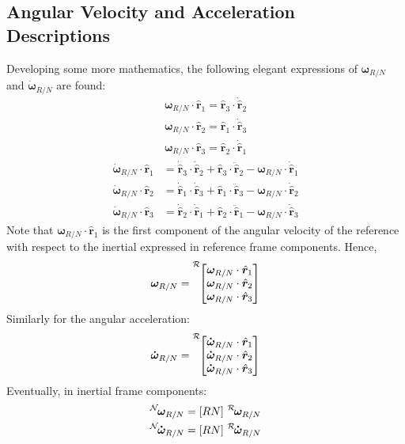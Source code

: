 \subsection{Angular Velocity and Acceleration Descriptions}
Developing some more mathematics, the following elegant expressions of $\bm\omega_{R/N}$ and $\dot{\bm\omega}_{R/N}$ are found:
\begin{subequations}
	\begin{align}
		\bm\omega_{R/N} \cdot \hat{\bm r}_{1}  = \hat{\bm r}_{3} \cdot \dot{\hat{\bm r}}_{2}  \\
		\bm\omega_{R/N} \cdot \hat{\bm r}_{2} = \hat{\bm r}_{1} \cdot \dot{\hat{\bm r}}_{3}\\
		\bm\omega_{R/N} \cdot \hat{\bm r}_{3} = \hat{\bm r}_{2} \cdot \dot{\hat{\bm r}}_{1}
	\end{align}
\end{subequations}
\begin{subequations}
	\begin{align}
		\dot{\bm\omega}_{R/N} \cdot \hat{\bm r}_{1} &=  
		\dot{\hat{\bm r}}_{3} \cdot \dot{\hat{\bm r}}_{2} + \hat{\bm r}_{3} \cdot \ddot{\hat{\bm r}}_{2} -  \bm\omega_{R/N} \cdot \dot{\hat{\bm r}}_{1}
		\\
		\dot{\bm\omega}_{R/N} \cdot \hat{\bm r}_{2} &= 
		 \dot{\hat{\bm r}}_{1} \cdot \dot{\hat{\bm r}}_{3} + \hat{\bm r}_{1} \cdot \ddot{\hat{\bm r}}_{3} -  \bm\omega_{R/N} \cdot \dot{\hat{\bm r}}_{2}	
		\\
		\dot{\bm\omega}_{R/N} \cdot \hat{\bm r}_{3} &=  
		\dot{\hat{\bm r}}_{2} \cdot \dot{\hat{\bm r}}_{1} + \hat{\bm r}_{2} \cdot \ddot{\hat{\bm r}}_{1} -  \bm\omega_{R/N} \cdot \dot{\hat{\bm r}}_{3}
	\end{align}
\end{subequations}
Note that $\bm\omega_{R/N} \cdot \hat{\bm r}_{1}$ is the first component of the angular velocity of the reference with respect to the inertial expressed in reference frame components. Hence,
\begin{equation}
	\bm\omega_{R/N}= \leftexp{R}{
		\begin{bmatrix}
			\bm\omega_{R/N} \cdot \hat{\bm r}_{1} \\
			\bm\omega_{R/N} \cdot \hat{\bm r}_{2}  \\
			\bm\omega_{R/N} \cdot \hat{\bm r}_{3} 
		\end{bmatrix}
	}
\end{equation}
Similarly for the angular acceleration:
\begin{equation}
	\bm{\dot\omega}_{R/N} = \leftexp{R}{
		\begin{bmatrix}
			\bm{\dot\omega}_{R/N} \cdot \hat{\bm r}_{1} \\
			\bm{\dot\omega}_{R/N} \cdot \hat{\bm r}_{2}  \\
			\bm{\dot\omega}_{R/N} \cdot \hat{\bm r}_{3} 
		\end{bmatrix}
	}
\end{equation}
Eventually, in inertial frame components:
\begin{subequations}
	\begin{align}
		\leftexp{N} {\bm\omega_{R/N}} &= [RN] \textrm{ } \leftexp{R} {\bm\omega_{R/N}} 
		\\
		\leftexp{N} {\bm{\dot\omega}_{R/N}} &= [RN]  \textrm{ } \leftexp{R} {\bm{\dot\omega}_{R/N}}
	\end{align}
\end{subequations}

 
 